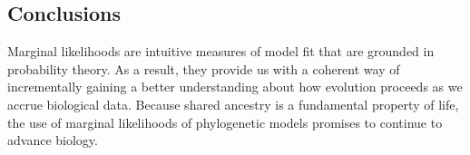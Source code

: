 \subsection{Conclusions}

Marginal likelihoods are intuitive measures of model fit that are grounded in
probability theory.
As a result, they provide us with a coherent way of incrementally gaining a
better understanding about how evolution proceeds as we accrue biological data.
Because shared ancestry is a fundamental property of life, the use of marginal
likelihoods of phylogenetic models promises to continue to advance biology.
